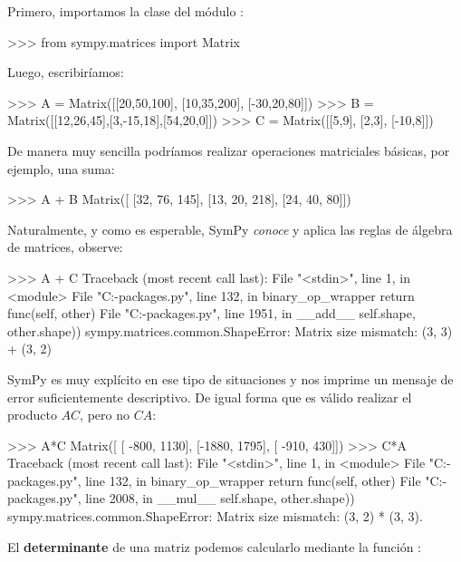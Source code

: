 Primero, importamos la clase  del módulo :

\begin{python}
>>> from sympy.matrices import Matrix
\end{python}

Luego, escribiríamos:

\begin{python}
>>> A = Matrix([[20,50,100], [10,35,200], [-30,20,80]])
>>> B = Matrix([[12,26,45],[3,-15,18],[54,20,0]])
>>> C = Matrix([[5,9], [2,3], [-10,8]])
\end{python}

De manera muy sencilla podríamos realizar operaciones matriciales básicas, por 
ejemplo, una suma:

\begin{python}
>>> A + B
Matrix([
[32, 76, 145],
[13, 20, 218],
[24, 40,  80]])
\end{python}

Naturalmente, y como es esperable, SymPy \textit{conoce} y aplica las reglas de álgebra de matrices, observe:

\begin{python}
>>> A + C
Traceback (most recent call last):
  File "<stdin>", line 1, in <module>
  File "C:\Users\delos{}\lib\site-packages\sympy\core\decorators.py", line 132, in binary_op_wrapper
    return func(self, other)
  File "C:\Users\delos{}\lib\site-packages\sympy\matrices\common.py", line 1951, in __add__
    self.shape, other.shape))
sympy.matrices.common.ShapeError: Matrix size mismatch: (3, 3) + (3, 2)
\end{python}

SymPy es muy explícito en ese tipo de situaciones y nos imprime un mensaje de error suficientemente descriptivo. 
De igual forma que es válido realizar el producto $AC$, pero no $CA$:

\begin{python}
>>> A*C
Matrix([
[ -800, 1130],
[-1880, 1795],
[ -910,  430]])
>>> C*A
Traceback (most recent call last):
  File "<stdin>", line 1, in <module>
  File "C:\Users\delos{}\lib\site-packages\sympy\core\decorators.py", line 132, in binary_op_wrapper
    return func(self, other)
  File "C:\Users\delos{}\lib\site-packages\sympy\matrices\common.py", line 2008, in __mul__
    self.shape, other.shape))
sympy.matrices.common.ShapeError: Matrix size mismatch: (3, 2) * (3, 3).
\end{python}

El \textbf{determinante} de una matriz podemos calcularlo mediante la función :

